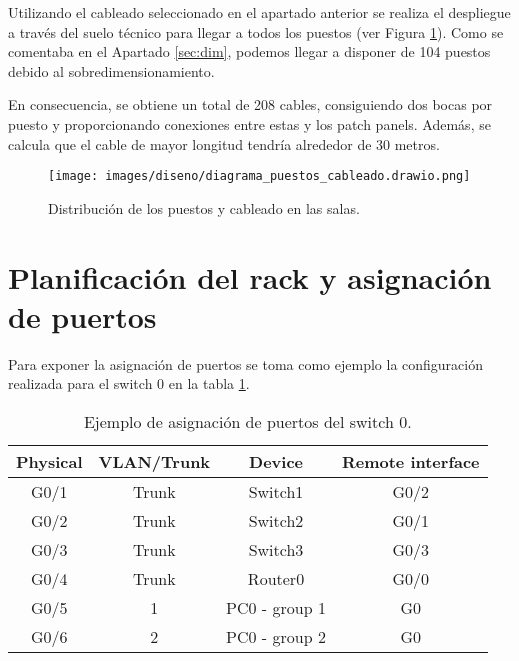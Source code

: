 \vspace{2mm}

Utilizando el cableado seleccionado en el apartado anterior se realiza el despliegue a través del suelo técnico para llegar a todos los puestos (ver Figura \ref{fig:puestos_cables}). Como se comentaba en el Apartado \ref{sec:dim}, podemos llegar a disponer de 104 puestos debido al sobredimensionamiento. 

En consecuencia, se obtiene un total de 208 cables, consiguiendo dos bocas por puesto y proporcionando conexiones entre estas y los patch panels. Además, se calcula que el cable de mayor longitud tendría alrededor de 30 metros.

\vspace{3mm}

    \begin{figure}[h]
    	\centering
    	\texttt{[image: images/diseno/diagrama\_puestos\_cableado.drawio.png]}
    	\caption{Distribución de los puestos y cableado en las salas.}
    	\label{fig:puestos_cables}
    \end{figure}
    

\section{Planificación del rack y asignación de puertos}

Para exponer la asignación de puertos se toma como ejemplo la configuración realizada para el switch 0 en la tabla \ref{tab:puertos}.

\vspace{2mm}

\begin{table}[h]
\centering
    \begin{tabular}{|c|c|c|c|}
    \hline
    \textbf{Physical} & \textbf{VLAN/Trunk} & \textbf{Device} & \textbf{Remote interface} \\ \hline
    G0/1 & Trunk & Switch1 & G0/2 \\ \hline
    G0/2 & Trunk & Switch2 & G0/1 \\ \hline
    G0/3 & Trunk & Switch3 & G0/3 \\ \hline
    G0/4 & Trunk & Router0 & G0/0 \\ \hline
    G0/5 & 1 & PC0 - group 1 & G0 \\ \hline
    G0/6 & 2 & PC0 - group 2 & G0 \\ \hline
    \end{tabular}
    \caption{Ejemplo de asignación de puertos del switch 0.}
     \label{tab:puertos}
\end{table}

